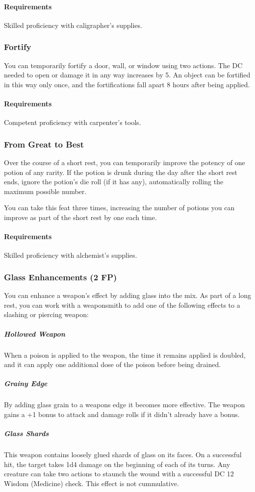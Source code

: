     \paragraph{Requirements} Skilled proficiency with caligrapher's supplies.
\subsubsection{Fortify} \label{feat::fortify}
    You can temporarily fortify a door, wall, or window using two actions.
    The DC needed to open or damage it in any way increases by 5.
    An object can be fortified in this way only once, and the fortifications fall apart 8 hours after being applied.
    \paragraph{Requirements} Competent proficiency with carpenter's tools.
\subsubsection{From Great to Best} \label{feat::fromgreattobest}
    Over the course of a short rest, you can temporarily improve the potency of one potion of any rarity.
    If the potion is drunk during the day after the short rest ends, ignore the potion's die roll (if it has any), automatically rolling the maximum possible number.

    You can take this feat three times, increasing the number of potions you can improve as part of the short rest by one each time.
    \paragraph{Requirements} Skilled proficiency with alchemist's supplies.
\subsubsection{Glass Enhancements (2 FP)} \label{feat::glassenhancement}
    You can enhance a weapon's effect by adding glass into the mix.
    As part of a long rest, you can work with a weaponsmith to add one of the following effects to a slashing or piercing weapon:
    \subparagraph{Hollowed Weapon} When a poison is applied to the weapon, the time it remains applied is doubled, and it can apply one additional dose of the poison before being drained.
    \subparagraph{Grainy Edge} By adding glass grain to a weapons edge it becomes more effective.
    The weapon gains a +1 bonus to attack and damage rolls if it didn't already have a bonus.
    \subparagraph{Glass Shards} This weapon contains loosely glued shards of glass on its faces.
    On a successful hit, the target takes 1d4 damage on the beginning of each of its turns.
    Any creature can take two actions to staunch the wound with a successful DC 12 Wisdom (Medicine) check.
    This effect is not cummulative.

